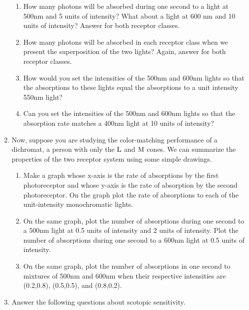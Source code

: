 \begin{enumerate}
 \begin{enumerate}

 \item How many photons will be absorbed during
one second to a light at 500nm and 5 units of intensity?
What about a light at 600 nm and 10 units of intensity?
Answer for both receptor classes.

 \item How many photons will be absorbed in each
receptor class when we present the superposition of the two lights?
Again, answer for both receptor classes.

 \item How would you set the intensities of the 500nm and 600nm
lights so that the absorptions to these lights
equal the absorptions to a unit intensity 550nm light?

\item Can you set the intensities of the 500nm and 600nm
lights so that the absorption rate matches a
400nm light at 10 units of intensity? 

 \end{enumerate}

\item Now, suppose you are studying the color-matching performance
of a dichromat, a person with
only the $\mbox{L}$ and $\mbox{M}$ cones.
We can summarize the properties of the two
receptor system using some simple drawings.

 \begin{enumerate}

 \item Make a graph whose x-axis is the rate of
absorptions by the first photoreceptor and whose
y-axis is the rate of absorption by the second photoreceptor.
On the graph plot the rate of absorptions to
each of the unit-intensity monochromatic lights.

 \item On the same graph,
plot the number of absorptions during one second
to a 500nm
light at 0.5 units of intensity and 2 units of intensity. 
Plot the number of absorptions during one second
to a 600nm light at 0.5 units of intensity.

 \item  On the same graph,
plot the number of absorptions in one second
to mixtures of
500nm and 600nm when their respective intensities are
(0.2,0.8), (0.5,0.5), and (0.8,0.2).

 \end{enumerate}

\item Answer the following questions about scotopic sensitivity.


\end{enumerate}
